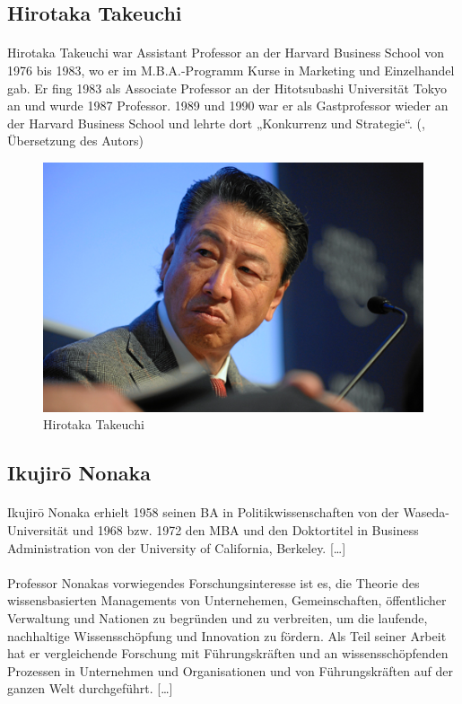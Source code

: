 \documentclass{article}
\begin{document}
\pagebreak

\subsection{Hirotaka Takeuchi}
\paragraph{}
Hirotaka Takeuchi war Assistant Professor an der Harvard Business School von 1976 bis 1983, wo er im M.B.A.-Programm Kurse in Marketing und Einzelhandel gab. Er fing 1983 als Associate Professor an der Hitotsubashi Universität Tokyo an und wurde 1987 Professor. 1989 und 1990 war er als Gastprofessor wieder an der Harvard Business School und lehrte dort „Konkurrenz und Strategie“. (\cite{hiro}, Übersetzung des Autors)

\begin{figure}[h]
  \centering
  \includegraphics[scale=.85]{img/hiro.png}
  \caption{Hirotaka Takeuchi}
  \label{hiropng}
\end{figure}


\subsection{Ikujirō Nonaka}
\paragraph{}
Ikujirō Nonaka erhielt 1958 seinen BA in Politikwissenschaften von der Waseda-Universität und 1968 bzw. 1972 den MBA und den Doktortitel in Business Administration von der University of California, Berkeley.
[\ldots]
\paragraph{}
Professor Nonakas vorwiegendes Forschungsinteresse ist es, die Theorie des wissensbasierten Managements von Unternehemen, Gemeinschaften, öffentlicher Verwaltung und Nationen zu begründen und zu verbreiten, um die laufende, nachhaltige Wissensschöpfung und Innovation zu fördern. Als Teil seiner Arbeit hat er vergleichende Forschung mit Führungskräften und an wissensschöpfenden Prozessen in Unternehmen und Organisationen und von Führungskräften auf der ganzen Welt durchgeführt.
[\ldots]
\end{document}
